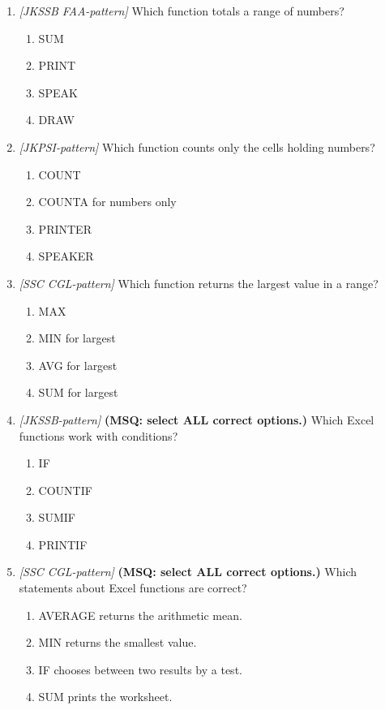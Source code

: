 \documentclass[11pt]{article}
\begin{document}
\begin{enumerate}[label=\textbf{Q\arabic*.}, leftmargin=*]
\item \textit{[JKSSB FAA-pattern]} Which function totals a range of numbers?
  \begin{enumerate}[label=\Alph*.]
    \item SUM
    \item PRINT
    \item SPEAK
    \item DRAW
  \end{enumerate}
\item \textit{[JKPSI-pattern]} Which function counts only the cells holding numbers?
  \begin{enumerate}[label=\Alph*.]
    \item COUNT
    \item COUNTA for numbers only
    \item PRINTER
    \item SPEAKER
  \end{enumerate}
\item \textit{[SSC CGL-pattern]} Which function returns the largest value in a range?
  \begin{enumerate}[label=\Alph*.]
    \item MAX
    \item MIN for largest
    \item AVG for largest
    \item SUM for largest
  \end{enumerate}
\item \textit{[JKSSB-pattern]} \textbf{(MSQ: select ALL correct options.)} Which Excel functions work with conditions?
  \begin{enumerate}[label=\Alph*.]
    \item IF
    \item COUNTIF
    \item SUMIF
    \item PRINTIF
  \end{enumerate}
\item \textit{[SSC CGL-pattern]} \textbf{(MSQ: select ALL correct options.)} Which statements about Excel functions are correct?
  \begin{enumerate}[label=\Alph*.]
    \item AVERAGE returns the arithmetic mean.
    \item MIN returns the smallest value.
    \item IF chooses between two results by a test.
    \item SUM prints the worksheet.
  \end{enumerate}
\end{enumerate}
\def\JKSSBLessonID{26}
\def\JKSSBAnswers{0}

\end{document}
